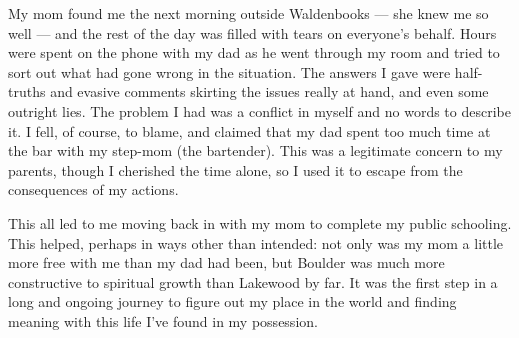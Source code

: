 My mom found me the next morning outside Waldenbooks --- she knew me so well --- and the rest of the day was filled with tears on everyone's behalf. Hours were spent on the phone with my dad as he went through my room and tried to sort out what had gone wrong in the situation. The answers I gave were half-truths and evasive comments skirting the issues really at hand, and even some outright lies. The problem I had was a conflict in myself and no words to describe it. I fell, of course, to blame, and claimed that my dad spent too much time at the bar with my step-mom (the bartender). This was a legitimate concern to my parents, though I cherished the time alone, so I used it to escape from the consequences of my actions.

This all led to me moving back in with my mom to complete my public schooling. This helped, perhaps in ways other than intended: not only was my mom a little more free with me than my dad had been, but Boulder was much more constructive to spiritual growth than Lakewood by far. It was the first step in a long and ongoing journey to figure out my place in the world and finding meaning with this life I've found in my possession.
